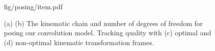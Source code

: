 \begin{figure}[t!]
\centering
\begin{overpic} 
[width=\linewidth]
{fig/posing/item.pdf}
\end{overpic}
\caption{
% 
% 
(a) 
(b) The kinematic chain and number of degrees of freedom for posing our convolution model.
Tracking quality with 
(c) optimal and (d) non-optimal kinematic transformation frames. 
% 
% 
}
\label{fig:posing}
\end{figure}